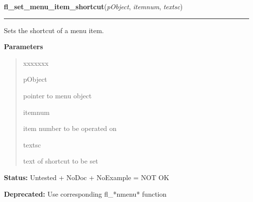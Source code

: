     \label{xformslib:deprecated:fl_set_menu_item_shortcut}

    \vspace{0.5ex}

\hspace{.8\funcindent}\begin{boxedminipage}{\funcwidth}

    \raggedright \textbf{fl\_set\_menu\_item\_shortcut}(\textit{pObject}, \textit{itemnum}, \textit{textsc})

    \vspace{-1.5ex}

    \rule{\textwidth}{0.5\fboxrule}
\setlength{\parskip}{2ex}
    Sets the shortcut of a menu item.

\setlength{\parskip}{1ex}
      \textbf{Parameters}
      \vspace{-1ex}

      \begin{quote}
        \begin{Ventry}{xxxxxxx}

          \item[pObject]

          pointer to menu object

          \item[itemnum]

          item number to be operated on

          \item[textsc]

          text of shortcut to be set

        \end{Ventry}

      \end{quote}

\textbf{Status:} Untested + NoDoc + NoExample = NOT OK



\textbf{Deprecated:} Use corresponding fl\_*nmenu* function



    \end{boxedminipage}

    \label{xformslib:deprecated:fl_set_menu_item_mode}

